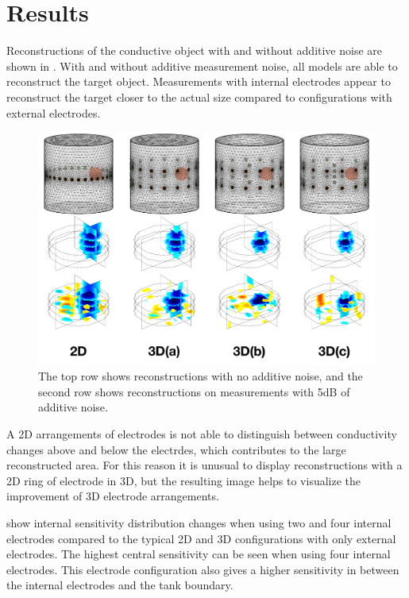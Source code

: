 \section{Results}

Reconstructions of the conductive object with and without additive noise are 
shown in . With and without additive measurement noise,
all models are able to reconstruct the target object. 
Measurements with internal electrodes appear to reconstruct the target 
closer to the actual size compared to configurations with external electrodes.

\begin{figure}
\centering
\includegraphics[width=\textwidth]{chapter6-internal_electrodes/imgs/Image_Comparison.pdf}
\caption[Internal electrode simulation reconstructions]{The top row shows reconstructions with no additive noise, and the second row shows reconstructions on measurements with 5dB of
additive noise.}
\label{fig:reconstruction_comparison}
\end{figure}

A 2D arrangements of electrodes is not able to distinguish between 
conductivity changes above and below the electrdes, which contributes to the large
reconstructed area. For this reason it is unusual to display reconstructions 
with a 2D ring of electrode in 3D, but the resulting image helps to visualize the
improvement of 3D electrode arrangements.

 show internal sensitivity distribution changes when 
using two and four internal electrodes compared to the
typical 2D and 3D configurations with only external electrodes. 
The highest central sensitivity can be seen when using four internal 
electrodes. This electrode configuration also 
gives a higher sensitivity in between the internal electrodes
and the tank boundary.

